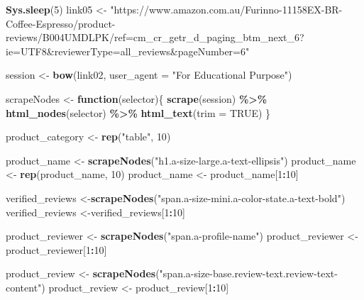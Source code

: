 \documentclass[
]{article}
\newenvironment{Shaded}{\begin{snugshade}}{\end{snugshade}}
\newcommand{\AttributeTok}[1]{\textcolor[rgb]{0.13,0.29,0.53}{#1}}
\newcommand{\ConstantTok}[1]{\textcolor[rgb]{0.56,0.35,0.01}{#1}}
\newcommand{\ControlFlowTok}[1]{\textcolor[rgb]{0.13,0.29,0.53}{\textbf{#1}}}
\newcommand{\DecValTok}[1]{\textcolor[rgb]{0.00,0.00,0.81}{#1}}
\newcommand{\FunctionTok}[1]{\textcolor[rgb]{0.13,0.29,0.53}{\textbf{#1}}}
\newcommand{\NormalTok}[1]{#1}
\newcommand{\OtherTok}[1]{\textcolor[rgb]{0.56,0.35,0.01}{#1}}
\newcommand{\SpecialCharTok}[1]{\textcolor[rgb]{0.81,0.36,0.00}{\textbf{#1}}}
\newcommand{\StringTok}[1]{\textcolor[rgb]{0.31,0.60,0.02}{#1}}
\begin{document}
\begin{Shaded}
\begin{Highlighting}[]
   \FunctionTok{Sys.sleep}\NormalTok{(}\DecValTok{5}\NormalTok{)}
\NormalTok{link05 }\OtherTok{\textless{}{-}} \StringTok{"https://www.amazon.com.au/Furinno{-}11158EX{-}BR{-}Coffee{-}Espresso/product{-}reviews/B004UMDLPK/ref=cm\_cr\_getr\_d\_paging\_btm\_next\_6?ie=UTF8\&reviewerType=all\_reviews\&pageNumber=6"}


\NormalTok{  session }\OtherTok{\textless{}{-}} \FunctionTok{bow}\NormalTok{(link02,}
               \AttributeTok{user\_agent =} \StringTok{"For Educational Purpose"}\NormalTok{)}

\NormalTok{  scrapeNodes }\OtherTok{\textless{}{-}} \ControlFlowTok{function}\NormalTok{(selector)\{}
    \FunctionTok{scrape}\NormalTok{(session) }\SpecialCharTok{\%\textgreater{}\%}
      \FunctionTok{html\_nodes}\NormalTok{(selector) }\SpecialCharTok{\%\textgreater{}\%}
      \FunctionTok{html\_text}\NormalTok{(}\AttributeTok{trim =} \ConstantTok{TRUE}\NormalTok{)}
\NormalTok{  \}}

\NormalTok{  product\_category }\OtherTok{\textless{}{-}} \FunctionTok{rep}\NormalTok{(}\StringTok{"table"}\NormalTok{, }\DecValTok{10}\NormalTok{)}

\NormalTok{  product\_name }\OtherTok{\textless{}{-}} \FunctionTok{scrapeNodes}\NormalTok{(}\StringTok{"h1.a{-}size{-}large.a{-}text{-}ellipsis"}\NormalTok{)}
\NormalTok{  product\_name }\OtherTok{\textless{}{-}} \FunctionTok{rep}\NormalTok{(product\_name, }\DecValTok{10}\NormalTok{)}
\NormalTok{  product\_name }\OtherTok{\textless{}{-}}\NormalTok{ product\_name[}\DecValTok{1}\SpecialCharTok{:}\DecValTok{10}\NormalTok{]}
  
\NormalTok{  verified\_reviews }\OtherTok{\textless{}{-}}\FunctionTok{scrapeNodes}\NormalTok{(}\StringTok{"span.a{-}size{-}mini.a{-}color{-}state.a{-}text{-}bold"}\NormalTok{)}
\NormalTok{  verified\_reviews }\OtherTok{\textless{}{-}}\NormalTok{verified\_reviews[}\DecValTok{1}\SpecialCharTok{:}\DecValTok{10}\NormalTok{]}
  
\NormalTok{  product\_reviewer }\OtherTok{\textless{}{-}} \FunctionTok{scrapeNodes}\NormalTok{(}\StringTok{"span.a{-}profile{-}name"}\NormalTok{)}
\NormalTok{  product\_reviewer }\OtherTok{\textless{}{-}}\NormalTok{ product\_reviewer[}\DecValTok{1}\SpecialCharTok{:}\DecValTok{10}\NormalTok{]}
  
\NormalTok{  product\_review }\OtherTok{\textless{}{-}} \FunctionTok{scrapeNodes}\NormalTok{(}\StringTok{"span.a{-}size{-}base.review{-}text.review{-}text{-}content"}\NormalTok{)}
\NormalTok{  product\_review }\OtherTok{\textless{}{-}}\NormalTok{ product\_review[}\DecValTok{1}\SpecialCharTok{:}\DecValTok{10}\NormalTok{]}
  

\end{Highlighting}
\end{Shaded}
\end{document}
